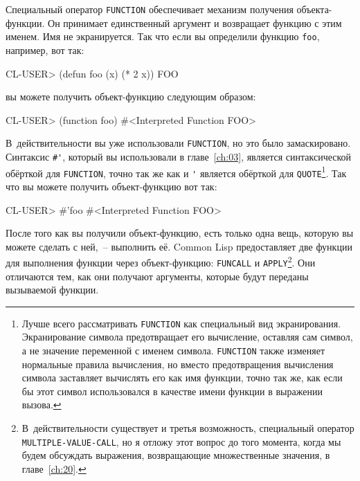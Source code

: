 Специальный оператор \lstinline{FUNCTION} обеспечивает механизм получения объекта-функции.  Он
принимает единственный аргумент и возвращает функцию с этим именем.  Имя не экранируется.
Так что если вы определили функцию \lstinline{foo}, например, вот так:

\begin{myverb}
CL-USER> (defun foo (x) (* 2 x))
FOO
\end{myverb}

\noindent{}вы можете получить объект-функцию следующим образом:

\begin{myverb}
CL-USER> (function foo)
#<Interpreted Function FOO>
\end{myverb}

В~действительности вы уже использовали \lstinline{FUNCTION}, но это было
замаскировано. Синтаксис \lstinline!#'!, который вы использовали в
главе~\ref{ch:03}, является синтаксической обёрткой для \lstinline{FUNCTION}, точно
так же как и \lstinline{'} является обёрткой для \lstinline{QUOTE}\footnote{Лучше всего
  рассматривать \lstinline{FUNCTION} как специальный вид экранирования.
  Экранирование символа предотвращает его вычисление, оставляя сам символ, а не
  значение переменной с именем символа. \lstinline{FUNCTION} также изменяет
  нормальные правила вычисления, но вместо предотвращения вычисления символа
  заставляет вычислять его как имя функции, точно так же, как если бы этот символ
  использовался в качестве имени функции в выражении вызова.}\hspace{\footnotenegspace}.  Так что вы можете
  получить объект-функцию вот так:

\begin{myverb}
CL-USER> #'foo
#<Interpreted Function FOO>
\end{myverb}

После того как вы получили объект-функцию, есть только одна вещь, которую вы можете
сделать с ней,~-- выполнить её. Common Lisp предоставляет две функции для выполнения
функции через объект-функцию: \lstinline{FUNCALL} и \lstinline{APPLY}\footnote{В~действительности
  существует и третья возможность, специальный оператор \lstinline{MULTIPLE-VALUE-CALL}, но я
  отложу этот вопрос до того момента, когда мы будем обсуждать выражения, возвращающие
  множественные значения, в главе~\ref{ch:20}.}\hspace{\footnotenegspace}. Они отличаются тем, как они получают
  аргументы, которые будут переданы вызываемой функции.

